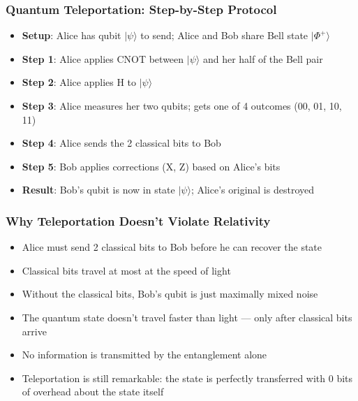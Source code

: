 \begin{frame}[fragile]\frametitle{Quantum Teleportation: Step-by-Step Protocol}
\begin{itemize}
\item \textbf{Setup}: Alice has qubit $|\psi\rangle$ to send; Alice and Bob share Bell state $|\Phi^+\rangle$
\item \textbf{Step 1}: Alice applies CNOT between $|\psi\rangle$ and her half of the Bell pair
\item \textbf{Step 2}: Alice applies H to $|\psi\rangle$
\item \textbf{Step 3}: Alice measures her two qubits; gets one of 4 outcomes (00, 01, 10, 11)
\item \textbf{Step 4}: Alice sends the 2 classical bits to Bob
\item \textbf{Step 5}: Bob applies corrections (X, Z) based on Alice's bits
\item \textbf{Result}: Bob's qubit is now in state $|\psi\rangle$; Alice's original is destroyed
\end{itemize}
\end{frame}

\begin{frame}[fragile]\frametitle{Why Teleportation Doesn't Violate Relativity}
\begin{itemize}
\item Alice must send 2 classical bits to Bob before he can recover the state
\item Classical bits travel at most at the speed of light
\item Without the classical bits, Bob's qubit is just maximally mixed noise
\item The quantum state doesn't travel faster than light --- only after classical bits arrive
\item No information is transmitted by the entanglement alone
\item Teleportation is still remarkable: the state is perfectly transferred with 0 bits of overhead about the state itself
\end{itemize}
\end{frame}

